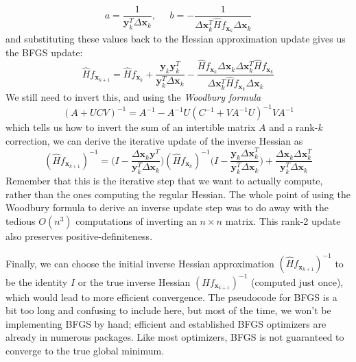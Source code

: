     \[a = \frac{1}{\mathbf{y}_k^T \Delta \mathbf{x}_k}, \;\;\;\;\; b = -\frac{1}{\Delta \mathbf{x}_k^T \hat{H} f_{\mathbf{x}_{k}} \Delta \mathbf{x}_k}\]
    and substituting these values back to the Hessian approximation update gives us the BFGS update: 
    \[\hat{H} f_{\mathbf{x}_{k+1}} = \hat{H} f_{\mathbf{x}_{k}} + \frac{\mathbf{y}_k \mathbf{y}_k^T}{\mathbf{y}_k^T \Delta \mathbf{x}_k} - \frac{\hat{H} f_{\mathbf{x}_{k}} \Delta \mathbf{x}_k \Delta \mathbf{x}_k^T \hat{H} f_{\mathbf{x}_{k}}}{\Delta \mathbf{x}_k^T \hat{H} f_{\mathbf{x}_{k}} \Delta \mathbf{x}_k}\]
    We still need to invert this, and using the \textit{Woodbury formula}
    \[(A + U C V)^{-1} = A^{-1} - A^{-1} U (C^{-1} + V A^{-1} U)^{-1} V A^{-1}\]
    which tells us how to invert the sum of an intertible matrix $A$ and a rank-$k$ correction, we can derive the iterative update of the inverse Hessian as 
    \[(\hat{H} f_{\mathbf{x}_{k+1}})^{-1} = \bigg( I - \frac{\Delta \mathbf{x}_k \mathbf{y}^T}{\mathbf{y}_k^T \Delta \mathbf{x}_k}\bigg) (\hat{H} f_{\mathbf{x}_{k}})^{-1} \bigg( I - \frac{\mathbf{y}_k \Delta \mathbf{x}_k^T}{\mathbf{y}_k^T \Delta \mathbf{x}_k}\bigg) + \frac{\Delta \mathbf{x}_k \Delta \mathbf{x}_k^T}{\mathbf{y}_k^T \Delta \mathbf{x}_k}\]
    Remember that this is the iterative step that we want to actually compute, rather than the ones computing the regular Hessian. The whole point of using the Woodbury formula to derive an inverse update step was to do away with the tedious $O(n^3)$ computations of inverting an $n \times n$ matrix. This rank-2 update also preserves positive-definiteness. 

    Finally, we can choose the initial inverse Hessian approximation $(\hat{H} f_{\mathbf{x}_{k+1}})^{-1}$ to be the identity $I$ or the true inverse Hessian $(H f_{\mathbf{x}_{k+1}})^{-1}$ (computed just once), which would lead to more efficient convergence. The pseudocode for BFGS is a bit too long and confusing to include here, but most of the time, we won't be implementing BFGS by hand; efficient and established BFGS optimizers are already in numerous packages. Like most optimizers, BFGS is not guaranteed to converge to the true global minimum. 

